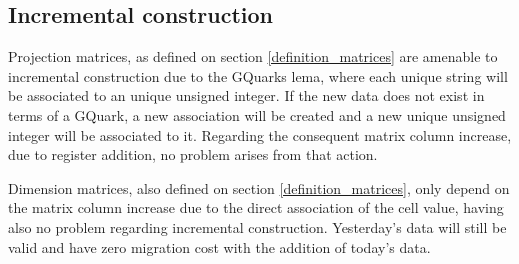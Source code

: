 \subsection{Incremental construction}
Projection matrices, as defined on section \ref{definition_matrices} are amenable to incremental construction due to the GQuarks lema, where each unique string will be associated to an unique unsigned integer. If the new data does not exist in terms of a GQuark, a new association will be created and a new unique unsigned integer will be associated to it. Regarding the consequent matrix column increase, due to register addition, no problem arises from that action.\par 
Dimension matrices, also defined on section \ref{definition_matrices}, only depend on the matrix column increase due to the direct association of the cell value, having also no problem regarding incremental construction.
Yesterday's data will still be valid and have zero migration cost with the addition of today's data.



    
 

